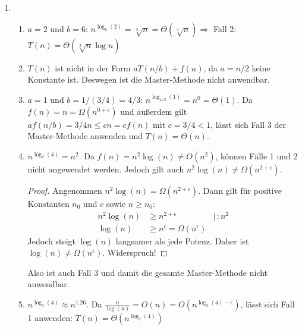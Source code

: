 \documentclass[11pt,a4paper]{article}
\begin{document}
\begin{loesung}
\begin{enumerate}
    \item
    \begin{enumerate}[label=\roman*)]
        \item $a = 2$ und $b = 6$: $n^{\log_6(2)} = \sqrt[3]{n} = \Theta(\sqrt[3]{n}) \Rightarrow$ Fall 2:
        $T(n) = \Theta(\sqrt[3]{n} \log n)$

        \item $T(n)$ ist nicht in der Form $a T(n / b) + f(n)$, da $a = n / 2$ keine Konstante ist. Deswegen ist die Master-Methode nicht anwendbar.

        \item $a = 1$ und $b = 1 / (3 / 4) = 4 / 3$:
        $n^{\log_{4/3}(1)} = n^0 = \Theta(1)$. Da $f(n) = n = \Omega(n^{0 + \epsilon})$
        und außerdem gilt $a f(n / b) = 3/4 n \leq c n = c f(n)$ mit $c = 3/4 < 1$, 
        lässt sich Fall 3 der Master-Methode anwenden und $T(n) = \Theta(n)$.

        \item $n^{\log_2(4)} = n^2$.
        Da $f(n) = n^2 \log(n) \neq O(n^2)$, können Fälle 1 und 2 nicht angewendet werden.
        Jedoch gilt auch $n^2 \log(n) \neq \Omega(n^{2 + \epsilon})$.
        \begin{proof}
            Angenommen $n^2 \log(n) = \Omega(n^{2 + \epsilon})$. Dann gilt für positive Konstanten $n_0$ und $c$ sowie $n \geq n_0$:
            \begin{align*}
                n^2 \log(n) &\geq n^{2 + \epsilon} &\mid \, : n^2 \\
                \log(n) &\geq n^\epsilon = \Omega(n^\epsilon)
            \end{align*}
            Jedoch steigt $\log(n)$ langsamer als jede Potenz.
            Daher ist $\log(n) \neq \Omega(n^\epsilon)$. Widerspruch!
        \end{proof}
        Also ist auch Fall 3 und damit die gesamte Master-Methode nicht anwendbar.

        \item $n^{\log_3(4)} \approx n^{1.26}$. Da $\frac{n}{\log(n)} = O(n) = O(n^{\log_3(4) - \epsilon})$, 
        lässt sich Fall 1 anwenden: $T(n) = \Theta(n^{\log_3(4)})$


\end{enumerate}
\end{enumerate}
\end{loesung}
\end{document}
